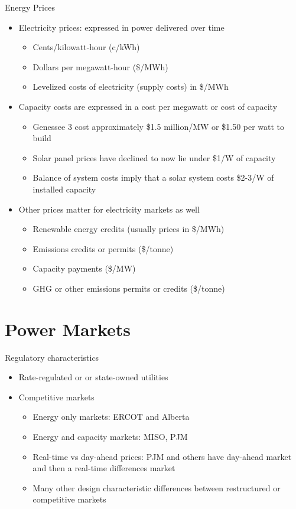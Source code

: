 \documentclass{beamer}
\renewcommand{\(}{\begin{columns}}
\renewcommand{\)}{\end{columns}}
\newcommand{\<}[1]{\begin{column}{#1}}
\renewcommand{\>}{\end{column}}
\begin{document}
\begin{frame}{Energy Prices}
\begin{itemize}
\setlength\itemsep{.25em}
\item Electricity prices: expressed in power delivered over time
\begin{itemize}
\setlength\itemsep{.15em}
\item Cents/kilowatt-hour (c/kWh)
\item Dollars per megawatt-hour (\$/MWh)
\item Levelized costs of electricity (supply costs) in \$/MWh
\end{itemize}

\item Capacity costs are expressed in a cost per megawatt or cost of capacity
\begin{itemize}
\setlength\itemsep{.15em}
\item Genessee 3 cost approximately \$1.5 million/MW or \$1.50 per watt to build
\item Solar panel prices have declined to now lie under \$1/W of capacity
\item Balance of system costs imply that a solar system costs \$2-3/W of installed capacity
\end{itemize}
\item Other prices matter for electricity markets as well
\begin{itemize}
\setlength\itemsep{.15em}
\item Renewable energy credits (usually prices in \$/MWh)
\item Emissions credits or permits (\$/tonne)
\item Capacity payments (\$/MW)
\item GHG or other emissions permits or credits (\$/tonne)
\end{itemize}
\end{itemize}

\vfill \end{frame}


\section{Power Markets}

\begin{frame}{Regulatory characteristics}
\begin{itemize}
\setlength\itemsep{.25em}
\item Rate-regulated or or state-owned utilities
\item Competitive markets
\begin{itemize}
\setlength\itemsep{.15em}
\item Energy only markets: ERCOT and Alberta
\item Energy and capacity markets: MISO, PJM
\item Real-time vs day-ahead prices: PJM and others have day-ahead market and then a real-time differences market
\item Many other design characteristic differences between restructured or competitive markets
\end{itemize}
\end{itemize}
\vfill
\end{frame}
\end{document}
